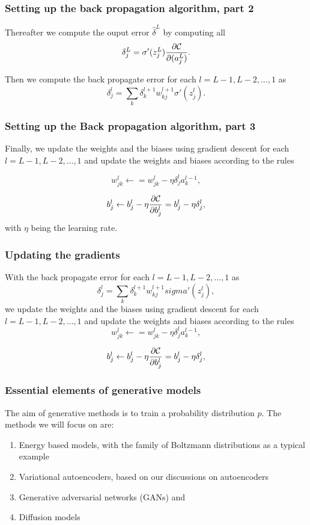\documentclass{beamer}
\begin{document}
\begin{frame}
\frametitle{Setting up the back propagation algorithm, part 2}

Thereafter we compute the ouput error $\hat{\delta}^L$ by computing all
\[
\delta_j^L = \sigma'(z_j^L)\frac{\partial {\cal C}}{\partial (a_j^L)}.
\]

Then we compute the back propagate error for each $l=L-1,L-2,\dots,1$ as
\[
\delta_j^l = \sum_k \delta_k^{l+1}w_{kj}^{l+1}\sigma'(z_j^l).
\]
\end{frame}

\begin{frame}
\frametitle{Setting up the Back propagation algorithm, part 3}

Finally, we update the weights and the biases using gradient descent
for each $l=L-1,L-2,\dots,1$ and update the weights and biases
according to the rules

\[
w_{jk}^l\leftarrow  = w_{jk}^l- \eta \delta_j^la_k^{l-1},
\]

\[
b_j^l \leftarrow b_j^l-\eta \frac{\partial {\cal C}}{\partial b_j^l}=b_j^l-\eta \delta_j^l,
\]
with $\eta$ being the learning rate.
\end{frame}

\begin{frame}
\frametitle{Updating the gradients}

With the back propagate error for each $l=L-1,L-2,\dots,1$ as
\[
\delta_j^l = \sum_k \delta_k^{l+1}w_{kj}^{l+1}sigma'(z_j^l),
\]
we update the weights and the biases using gradient descent for each $l=L-1,L-2,\dots,1$ and update the weights and biases according to the rules
\[
w_{jk}^l\leftarrow  = w_{jk}^l- \eta \delta_j^la_k^{l-1},
\]

\[
b_j^l \leftarrow b_j^l-\eta \frac{\partial {\cal C}}{\partial b_j^l}=b_j^l-\eta \delta_j^l,
\]
\end{frame}

\begin{frame}
\frametitle{Essential elements of generative models}

The aim of generative methods is to train a probability distribution $p$. The methods we will focus on are:
\begin{enumerate}
\item Energy based models, with the family of Boltzmann distributions as a typical example

\item Variational autoencoders, based on our discussions on autoencoders

\item Generative adversarial networks (GANs) and

\item Diffusion models
\end{enumerate}

\noindent
\end{frame}
\end{document}
